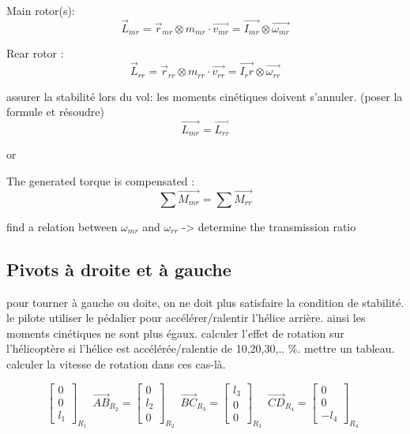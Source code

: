 \documentclass[12pt,a4paper]{article}
\begin{document}
Main rotor(s):
\begin{equation}
\vec{L}_{mr}=\vec{r}_{mr} \otimes m_{mr} \cdot \vec{v_{mr}}=\vec{I_{mr}} \otimes \vec{\omega_{mr}}
\end{equation}


Rear rotor : 
\begin{equation}
\vec{L}_{rr}=\vec{r}_{rr} \otimes m_{rr} \cdot \vec{v_{rr}}=\vec{I_rr} \otimes \vec{\omega_{rr}}
\end{equation}

assurer la stabilité lors du vol: les moments cinétiques doivent s'annuler. (poser la formule et résoudre)
\begin{equation}
\vec{L_{mr}}=\vec{L_{rr}}
\end{equation}

or

The generated torque is compensated : 
\begin{equation}
\sum \vec{M_{mr}}=\sum \vec{M_{rr}}
\end{equation}

find a relation between $\omega_{mr}$ and $\omega_{rr}$ -> determine the transmission ratio

\subsection{Pivots à droite et à gauche}
pour tourner à gauche ou doite, on ne doit plus satisfaire la condition de stabilité. le pilote utiliser le pédalier pour accélérer/ralentir l'hélice arrière. ainsi les moments cinétiques ne sont plus égaux.
\medbreak
calculer l'effet de rotation sur l'hélicoptère si l'hélice est accélérée/ralentie de 10,20,30,.. $\%$. mettre un tableau. calculer la vitesse de rotation dans ces cas-là. 


\begin{equation}
\begin{bmatrix}
0 \\
0\\
l_1
\end{bmatrix}_{R_{1}} \enspace
\vec{AB}_{R_{2}}=
\begin{bmatrix}
0 \\
l_2\\
0
\end{bmatrix}_{R_{2}} \enspace
\vec{BC}_{R_{3}}=
\begin{bmatrix}
l_3 \\
0\\
0
\end{bmatrix}_{R_{3}} \enspace
\vec{CD}_{R_{4}}=
\begin{bmatrix}
0 \\
0\\
-l_4
\end{bmatrix}_{R_{4}} \enspace
\end{equation}
\end{document}
